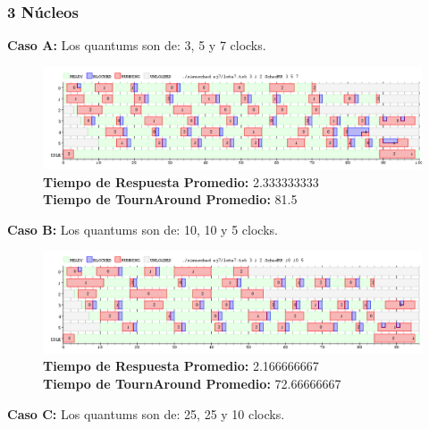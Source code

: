 \documentclass[a4paper]{article}
\begin{document}
 \newpage
	\subsubsection*{3 N\'ucleos}
	
	\textbf{Caso A:} Los quantums son de: 3, 5 y 7 clocks.

		 \begin{figure}[h!]
   \begin{center}
 	\includegraphics[scale=0.5]{imagenes/ej7/3nucleoA.png}
 	\textbf{Tiempo de Respuesta Promedio:} 2.333333333 \\
 	\textbf{Tiempo de TournAround Promedio:} 81.5 \\
   \end{center}
 \end{figure} 
 	
	\textbf{Caso B:}  Los quantums son de: 10, 10 y 5 clocks.

		 \begin{figure}[h!]
   \begin{center}
 	\includegraphics[scale=0.5]{imagenes/ej7/3nucleoB.png}
 	\textbf{Tiempo de Respuesta Promedio:} 2.166666667 \\
 	\textbf{Tiempo de TournAround Promedio:} 72.66666667 \\
   \end{center}
 \end{figure} 
 	
	\textbf{Caso C:}  Los quantums son de: 25, 25 y 10 clocks.
\end{document}
